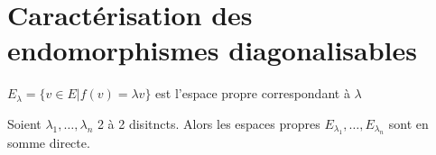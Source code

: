 \documentclass[french]{yLectureNote}
\begin{document}
\section{Caractérisation des endomorphismes diagonalisables}
\begin{definition}
 \(E_{\lambda} = \{v\in E|f(v)=\lambda  v\}\) est l'espace propre correspondant à \(\lambda\)
\end{definition}
\begin{proposition}
Soient \(\lambda_1,\dots,\lambda_n\) 2 à 2 disitncts. Alors les espaces propres \(E_{\lambda_1}, \dots, E_{\lambda_{n}}\) sont en somme directe.
\end{proposition}
\begin{theorem}

\end{theorem}
\end{document}

